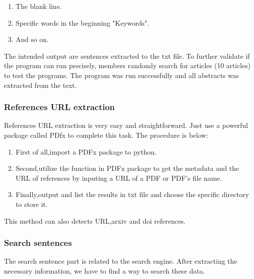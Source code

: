	\begin{enumerate}
			
		\item The blank line.
		\item Specific words in the beginning "Keywords".
		\item And so on.
					
	\end{enumerate}
	
	The intended output are sentences extracted to the txt file.
	To further validate if the program can run precisely, members randomly search for articles (10 articles) to test the programs.
	The program was run successfully and all abstracts was extracted from the text.
	 	
\subsubsection{References URL extraction}

References URL extraction is very easy and straightforward.
Just use a powerful package called PDfx to complete this task.
The procedure is below:

\begin{enumerate}
	
	\item First of all,import a PDFx package to python.
	\item Second,utilize the function in PDFx package to get the metadata and the URL of references by inputing a URL of a PDF or PDF's file name.
	\item Finally,output and list the results in txt file and choose the specific directory to store it.

\end{enumerate}
 
This method can also detects URL,arxiv and doi references.

\subsubsection{Search sentences}

The search sentence part is related to the search engine.
 After extracting the necessary information, we have to find a way to search these data.
 
